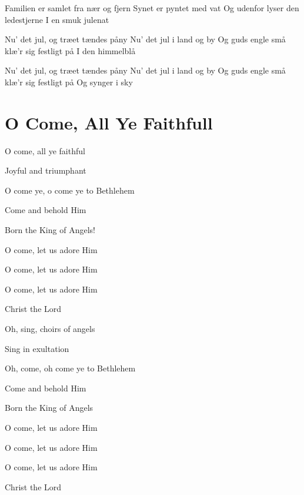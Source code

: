 \documentclass[11pt]{beamer}
\begin{document}
\begin{frame}
Familien er samlet fra nær og fjern
Synet er pyntet med vat
Og udenfor lyser den ledestjerne
I en smuk julenat
\end{frame}

\begin{frame}
Nu' det jul, og træet tændes påny
Nu' det jul i land og by
Og guds engle små klæ'r sig festligt på
I den himmelblå
\end{frame}
\begin{frame}
Nu' det jul, og træet tændes påny
Nu' det jul i land og by
Og guds engle små klæ'r sig festligt på
Og synger i sky
\end{frame}

\toc
\section{O Come, All Ye Faithfull}
\begin{frame}
O come, all ye faithful

Joyful and triumphant

O come ye, o come ye to Bethlehem

Come and behold Him

Born the King of Angels!
\end{frame}

\begin{frame}
O come, let us adore Him

O come, let us adore Him

O come, let us adore Him

Christ the Lord
\end{frame}

\begin{frame}
Oh, sing, choirs of angels

Sing in exultation

Oh, come, oh come ye to Bethlehem

Come and behold Him

Born the King of Angels
\end{frame}

\begin{frame}
O come, let us adore Him

O come, let us adore Him

O come, let us adore Him

Christ the Lord
\end{frame}

\toc
\end{document}
